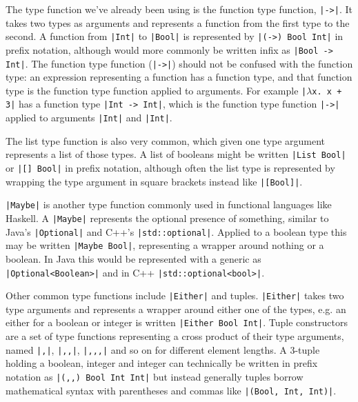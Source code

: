 \documentclass[a4paper,fleqn,12pt]{article}
\begin{document}
The type function we’ve already been using is the function type function, \texttt{|->|}. It takes two types as arguments and represents a function from the first type to the second. A function from \texttt{|Int|} to \texttt{|Bool|} is represented by \texttt{|(->) Bool Int|} in prefix notation, although would more commonly be written infix as \texttt{|Bool -> Int|}. The function type function (\texttt{|->|}) should not be confused with the function type: an expression representing a function has a function type, and that function type is the function type function applied to arguments. For example \texttt{|$\lambda$x. x + 3|} has a function type \texttt{|Int -> Int|}, which is the function type function \texttt{|->|} applied to arguments \texttt{|Int|} and \texttt{|Int|}.

The list type function is also very common, which given one type argument represents a list of those types. A list of booleans might be written \texttt{|List Bool|} or \texttt{|[] Bool|} in prefix notation, although often the list type is represented by wrapping the type argument in square brackets instead like \texttt{|[Bool]|}.

\texttt{|Maybe|} is another type function commonly used in functional languages like Haskell. A \texttt{|Maybe|} represents the optional presence of something, similar to Java’s \texttt{|Optional|} and C++’s \texttt{|std::optional|}. Applied to a boolean type this may be written \texttt{|Maybe Bool|}, representing a wrapper around nothing or a boolean. In Java this would be represented with a generic as \texttt{|Optional<Boolean>|} and in C++ \texttt{|std::optional<bool>|}.

Other common type functions include \texttt{|Either|} and tuples. \texttt{|Either|} takes two type arguments and represents a wrapper around either one of the types, e.g. an either for a boolean or integer is written \texttt{|Either Bool Int|}. Tuple constructors are a set of type functions representing a cross product of their type arguments, named \texttt{|,|}, \texttt{|,,|}, \texttt{|,,,|} and so on for different element lengths. A 3-tuple holding a boolean, integer and integer can technically be written in prefix notation as \texttt{|(,,) Bool Int Int|} but instead generally tuples borrow mathematical syntax with parentheses and commas like \texttt{|(Bool, Int, Int)|}.
\end{document}
